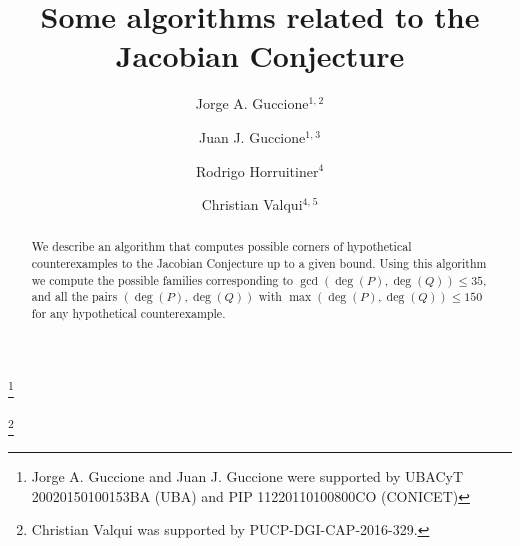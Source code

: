 \documentclass[reqno,a4paper,twoside]{amsart}
\theoremstyle{definition}
\theoremstyle{remark}
\begin{document}
\title{Some algorithms related to the Jacobian Conjecture}

\author[Jorge A. Guccione]{Jorge A. Guccione$^{1,}$$^2$}
\address{$^1$ Universidad de Buenos Aires. Facultad de Ciencias Exactas y Naturales. Departamento de Matem\'atica. Buenos Aires. Argentina}
\address{$^2$ CONICET-Universidad de Buenos Aires. Instituto de Investigaciones Matem\'aticas ``Luis A. santal\'o'' (IMAS). Buenos Aires. Argentina}

\author[Juan J. Guccione]{Juan J. Guccione$^{1,}$$^3$}
\address{$^3$ CONICET. Instituto Argentino de Matem\'atica (IAM). Buenos Aires. Argentina}

\thanks{Jorge A. Guccione and Juan J. Guccione were supported by UBACyT 20020150100153BA (UBA) and PIP 11220110100800CO (CONICET)}

\author[Rodrigo Horruitiner]{Rodrigo Horruitiner$^{4}$}

\author[Christian Valqui]{Christian Valqui$^{4,}$$^5$}
\address{$^4$Pontificia Universidad Cat\'olica del Per\'u, Secci\'on Matem\'aticas, PUCP,
Av. Universitaria 1801, San Miguel, Lima 32, Per\'u.}

\address{$^5$Instituto de Matem\'atica y Ciencias Afines (IMCA) Calle Los Bi\'ologos 245. Urb San C\'esar.
La Molina, Lima 12, Per\'u.}
\thanks{Christian Valqui was supported by PUCP-DGI-CAP-2016-329.}



\begin{abstract}
We describe an algorithm that computes possible corners of hypothetical counterexamples to the Jacobian Conjecture up to a given bound. Using this algorithm we compute the possible families corresponding to $\gcd(\deg(P),\deg(Q))\le 35$, and all the pairs $(\deg(P),\deg(Q))$ with $\max(\deg(P),\deg(Q))\le 150$ for any hypothetical counterexample.
\end{abstract}

\maketitle

\setcounter{tocdepth}{2}
\tableofcontents
\end{document}
